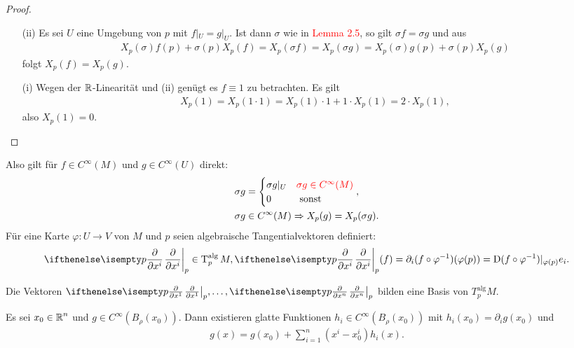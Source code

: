 \begin{proof}\begin{enumerate}[label=(\roman*),widest=ii,leftmargin=*]
\item[(ii)]
	Es sei $U$ eine Umgebung von $p$ mit $f|_U = g|_U$. Ist dann $\sigma$ wie in \textcolor{red}{Lemma 2.5}, so gilt $\sigma f = \sigma g$ und aus
	\begin{align*}
		X_p(\sigma)f(p)+\sigma(p)X_p(f) = X_{p}(\sigma f) = X_p(\sigma g) = X_p(\sigma) g(p) + \sigma(p) X_p(g)
	\end{align*}
	folgt $X_p(f) = X_p(g)$.\\
\item[(i)]
	Wegen der $\operatorname{\mathbb{R}}$-Linearität und (ii) genügt es $f \equiv 1$ zu betrachten. Es gilt
	\begin{align*}
		X_p(1) = X_p(1 \cdot 1) = X_p(1) \cdot 1 + 1 \cdot X_p(1) = 2 \cdot X_p(1),
	\end{align*}
	also $X_p(1) = 0$.
\end{enumerate}\end{proof}

\begin{bem}
  Also gilt für $f \in C^{\infty}(M)$ und $g \in C^{\infty}(U)$ direkt:
  \begin{align*}
    & \sigma g =
    \begin{cases}
      \sigma g|_U & \textcolor{red}{\sigma g \in C^{\infty}(M)}\\
      0 & \text{ sonst }
    \end{cases},\\
    & \sigma g \in C^{\infty}(M) 
    \Rightarrow X_p(g) = X_p(\sigma g).
  \end{align*}
  Für eine Karte $\varphi \colon U \to V$ von $M$ und $p$ seien algebraische Tangentialvektoren definiert:
  \begin{align*}
    \pdifffrac[p]{}{x^i} \in \T_p^{\text{alg}}M, \pdifffrac[p]{}{x^i}(f) = \partial_i(f \circ \varphi^{-1})(\varphi(p)) = \D(f \circ \varphi^{-1})|_{\varphi(p)}e_i.
  \end{align*}
\end{bem}

\begin{satz}
  Die Vektoren $\pdifffrac[p]{}{x^1},\ldots,\pdifffrac[p]{}{x^n}$ bilden eine Basis von $T_p^{\text{alg}}M$.
\end{satz}

\begin{lemma}
  Es sei $x_0 \in \operatorname{\mathbb{R}}^n$ und $g \in C^{\infty}(B_{\rho}(x_0))$.
  Dann existieren glatte Funktionen $h_i \in C^{\infty}(B_{\rho}(x_0))$ mit $h_i(x_0) = \partial_ig(x_0)$ und 
  \begin{align*}
    g(x) = g(x_0) + \sum_{i=1}^n(x^i-x_0^i)h_i(x).
  \end{align*}
\end{lemma}


